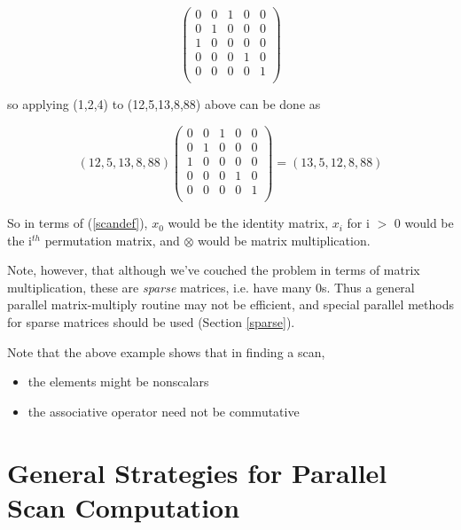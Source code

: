 \begin{equation}
\left (
\begin{array}{rrrrr}
0 & 0 & 1 & 0 & 0 \\
0 & 1 & 0 & 0 & 0 \\
1 & 0 & 0 & 0 & 0 \\
0 & 0 & 0 & 1 & 0 \\
0 & 0 & 0 & 0 & 1 \\
\end{array}
\right )
\end{equation}

so applying (1,2,4) to (12,5,13,8,88) above can be done as

\begin{equation}
(12,5,13,8,88)
\left (
\begin{array}{rrrrr}
0 & 0 & 1 & 0 & 0 \\
0 & 1 & 0 & 0 & 0 \\
1 & 0 & 0 & 0 & 0 \\
0 & 0 & 0 & 1 & 0 \\
0 & 0 & 0 & 0 & 1 \\
\end{array}
\right )
= (13,5,12,8,88)
\end{equation}

So in terms of (\ref{scandef}), $x_0$ would be the identity matrix,
$x_i$ for i $>$ 0 would be the i$^{th}$ permutation matrix, and
$\otimes$ would be matrix multiplication.  

Note, however, that although we've couched the problem in terms of
matrix multiplication, these are {\it sparse} matrices, i.e. have many
0s.  Thus a general parallel matrix-multiply routine may not be
efficient, and special parallel methods for sparse matrices should be
used (Section \ref{sparse}).

Note that the above example shows that in finding a scan,

\begin{itemize}

\item the elements might be nonscalars

\item the associative operator need not be commutative

\end{itemize}

\section{General Strategies for Parallel Scan Computation}
\label{genpar}

